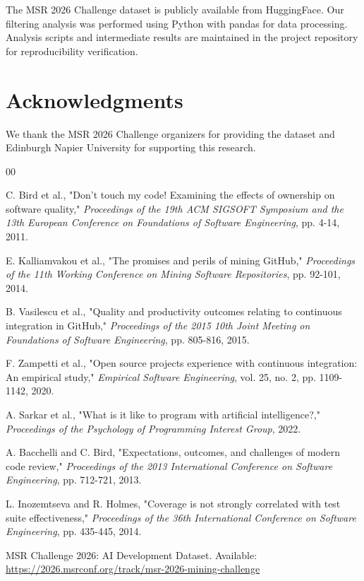 \documentclass[conference]{IEEEtran}
\begin{document}
The MSR 2026 Challenge dataset is publicly available from HuggingFace. Our filtering analysis was performed using Python with pandas for data processing. Analysis scripts and intermediate results are maintained in the project repository for reproducibility verification.

\section*{Acknowledgments}

We thank the MSR 2026 Challenge organizers for providing the dataset and Edinburgh Napier University for supporting this research.

\balance
\begin{thebibliography}{00}

 C. Bird et al., "Don't touch my code! Examining the effects of ownership on software quality," \textit{Proceedings of the 19th ACM SIGSOFT Symposium and the 13th European Conference on Foundations of Software Engineering}, pp. 4-14, 2011.

 E. Kalliamvakou et al., "The promises and perils of mining GitHub," \textit{Proceedings of the 11th Working Conference on Mining Software Repositories}, pp. 92-101, 2014.

 B. Vasilescu et al., "Quality and productivity outcomes relating to continuous integration in GitHub," \textit{Proceedings of the 2015 10th Joint Meeting on Foundations of Software Engineering}, pp. 805-816, 2015.

 F. Zampetti et al., "Open source projects experience with continuous integration: An empirical study," \textit{Empirical Software Engineering}, vol. 25, no. 2, pp. 1109-1142, 2020.

 A. Sarkar et al., "What is it like to program with artificial intelligence?," \textit{Proceedings of the Psychology of Programming Interest Group}, 2022.

 A. Bacchelli and C. Bird, "Expectations, outcomes, and challenges of modern code review," \textit{Proceedings of the 2013 International Conference on Software Engineering}, pp. 712-721, 2013.

 L. Inozemtseva and R. Holmes, "Coverage is not strongly correlated with test suite effectiveness," \textit{Proceedings of the 36th International Conference on Software Engineering}, pp. 435-445, 2014.

 MSR Challenge 2026: AI Development Dataset. Available: \url{https://2026.msrconf.org/track/msr-2026-mining-challenge}

\end{thebibliography}
\end{document}

